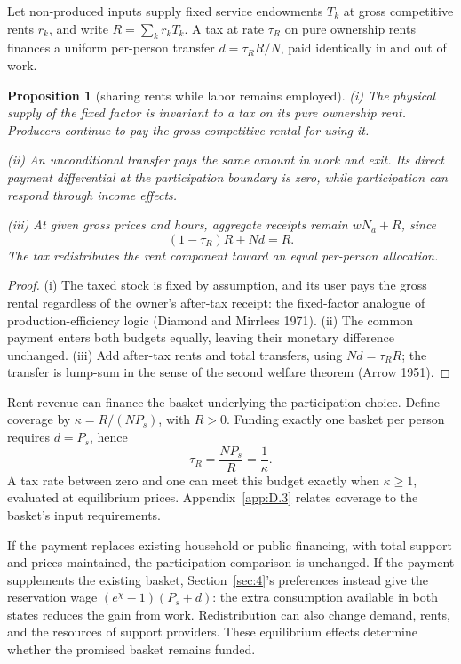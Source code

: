 \documentclass[12pt]{article}
\theoremstyle{plain}
\newtheorem{proposition}{Proposition}
\begin{document}
Let non-produced inputs supply fixed service endowments $T_k$ at gross competitive rents $r_k$, and write $R=\sum_kr_kT_k$. A tax at rate $\tau_R$ on pure ownership rents finances a uniform per-person transfer $d=\tau_RR/N$, paid identically in and out of work.

\begin{proposition}[sharing rents while labor remains employed]\label{prop:6}
(i) The physical supply of the fixed factor is invariant to a tax on its pure ownership rent. Producers continue to pay the gross competitive rental for using it.

(ii) An unconditional transfer pays the same amount in work and exit. Its direct payment differential at the participation boundary is zero, while participation can respond through income effects.

(iii) At given gross prices and hours, aggregate receipts remain $wN_a+R$, since
\[
(1-\tau_R)R+Nd=R.
\]
The tax redistributes the rent component toward an equal per-person allocation.
\end{proposition}

\begin{proof}
(i) The taxed stock is fixed by assumption, and its user pays the gross rental regardless of the owner's after-tax receipt: the fixed-factor analogue of production-efficiency logic (Diamond and Mirrlees 1971). (ii) The common payment enters both budgets equally, leaving their monetary difference unchanged. (iii) Add after-tax rents and total transfers, using $Nd=\tau_RR$; the transfer is lump-sum in the sense of the second welfare theorem (Arrow 1951).
\end{proof}

Rent revenue can finance the basket underlying the participation choice. Define coverage by $\kappa=R/(NP_s)$, with $R>0$. Funding exactly one basket per person requires $d=P_s$, hence
\begin{equation}\label{eq:16}
\tau_R=\frac{NP_s}{R}=\frac{1}{\kappa}.
\end{equation}
A tax rate between zero and one can meet this budget exactly when $\kappa\ge1$, evaluated at equilibrium prices. Appendix~\ref{app:D.3} relates coverage to the basket's input requirements.

If the payment replaces existing household or public financing, with total support and prices maintained, the participation comparison is unchanged. If the payment supplements the existing basket, Section~\ref{sec:4}'s preferences instead give the reservation wage $(e^\chi-1)(P_s+d)$: the extra consumption available in both states reduces the gain from work. Redistribution can also change demand, rents, and the resources of support providers. These equilibrium effects determine whether the promised basket remains funded.
\end{document}
